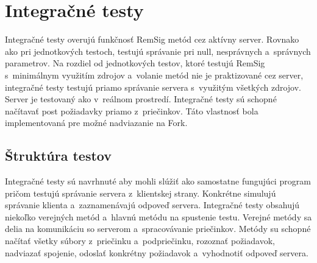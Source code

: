 \documentclass[
  digital, %
  table,   %
oneside,
  nolof,     %
  nolot,     %
]{fithesis3}
\begin{document}
\section{Integračné testy}
Integračné testy  overujú funkčnosť RemSig metód cez aktívny server. Rovnako ako pri jednotkových testoch, testujú správanie pri null, nesprávnych a~správnych parametrov. Na rozdiel od jednotkových testov, ktoré testujú RemSig s~minimálnym využitím zdrojov a~volanie metód nie je praktizované cez server, integračné testy testujú priamo správanie servera s~využitým všetkých zdrojov. Server je testovaný ako v~reálnom prostredí. Integračné testy sú schopné načítavať post požiadavky priamo z~priečinkov. Táto  vlastnosť bola implementovaná pre možné nadviazanie na  Fork.
\subsection{Štruktúra testov}  
 Integračné testy sú navrhnuté aby mohli slúžiť ako samostatne fungujúci program pričom testujú správanie servera z~klientskej strany. Konkrétne simulujú správanie klienta a~zaznamenávajú odpoveď servera. Integračné testy obsahujú niekoľko verejných metód a~hlavnú metódu na spustenie testu. Verejné metódy sa delia na komunikáciu so serverom a~spracovávanie priečinkov. Metódy su schopné načítať všetky súbory z~priečinku a~podpriečinku, rozoznať požiadavok, nadviazať spojenie, odoslať konkrétny požiadavok a~vyhodnotiť odpoveď servera. 
\end{document}
